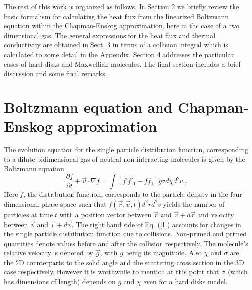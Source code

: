 \documentclass[11pt]{article} %
\begin{document}
The rest of this work is organized as follows. In Section 2 we briefly
review the basic formalism for calculating the heat flux from the
linearized Boltzmann equation within the Chapman-Enskog approximation,
here in the case of a two dimensional gas. The general expressions
for the heat flux and thermal conductivity are obtained in Sect. 3
in terms of a collision integral which is calculated to some detail
in the Appendix. Section 4 addresses the particular cases of hard
disks and Maxwellian molecules. The final section includes a brief
discussion and some final remarks.

\section{Boltzmann equation and Chapman-Enskog approximation}

The evolution equation for the single particle distribution function,
corresponding to a dilute bidimensional gas of neutral non-interacting
molecules is given by the Boltzmann equation \cite{Ch-E} 
\begin{equation}
\frac{\partial f}{\partial t}+\vec{v}\cdot \nabla f=\int\left[f'f'_{1}-ff_{1}\right]g\sigma d\chi d^{2}v_{1}.\label{1}
\end{equation}
Here $f$, the distribution function, corresponds to the particle
density in the four dimensional phase space such that $f\left(\vec{r},\vec{v},t\right)d^{2}rd^{2}v$
yields the number of particles at time $t$ with a position vector
between $\vec{r}$ and $\vec{r}+d\vec{r}$ and velocity between $\vec{v}$
and $\vec{v}+d\vec{v}$. The right hand side of Eq. (\ref{1}) accounts
for changes in the single particle distribution function due to collisions.
Non-primed and primed quantities denote values before and after the
collision respectively. The molecule's relative velocity is denoted
by $\vec{g}$, with $g$ being its magnitude. Also $\chi$ and $\sigma$
are the 2D counterparts to the solid angle and
the scattering cross section in the 3D case respectively. However it is worthwhile to mention at this point that $\sigma$ (which has dimensions of length) depends on $g$ and $\chi$ even for a hard disks model.
\end{document}
